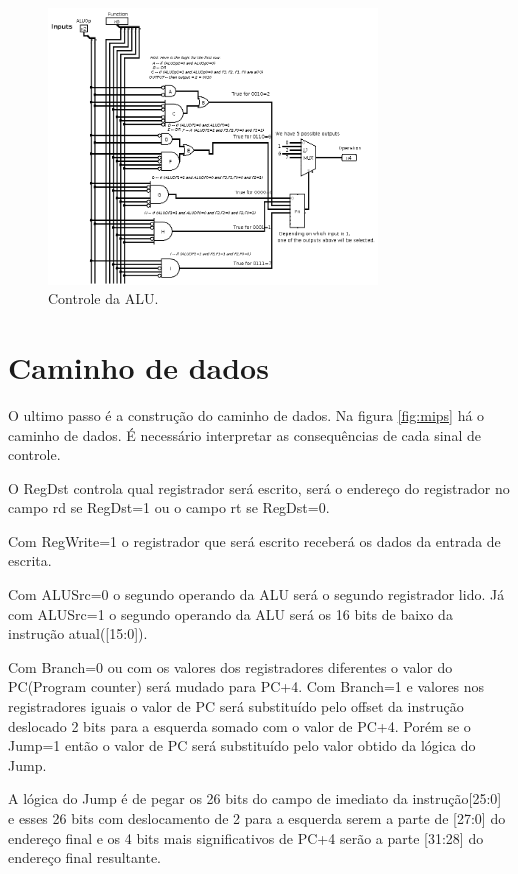 \documentclass[12pt]{article}
\begin{document}
\begin{figure}[htbp]
\centering
\includegraphics[width=330px]{./controlalu.png}
\caption{\label{fig:controlalu}
Controle da ALU.}
\end{figure}

\section{Caminho de dados}
\label{sec:org2a9f833}
O ultimo passo é a construção do caminho de dados. Na figura \ref{fig:mips} há o caminho de dados. É necessário interpretar as consequências de cada sinal de controle.

O RegDst controla qual registrador será escrito, será o endereço do registrador no campo rd se RegDst=1 ou o campo rt se RegDst=0.

Com RegWrite=1 o registrador que será escrito receberá os dados da entrada de escrita.

Com ALUSrc=0 o segundo operando da ALU será o segundo registrador lido. Já com ALUSrc=1 o segundo operando da ALU será os 16 bits de baixo da instrução atual([15:0]).

Com Branch=0 ou com os valores dos registradores diferentes o valor do PC(Program counter) será mudado para PC+4. Com Branch=1 e valores nos registradores iguais o valor de PC será substituído pelo offset da instrução deslocado 2 bits para a esquerda somado com o valor de PC+4. Porém se o Jump=1 então o valor de PC será substituído pelo valor obtido da lógica do Jump.

A lógica do Jump é de pegar os 26 bits do campo de imediato da instrução[25:0] e esses 26 bits com deslocamento de 2 para a esquerda serem a parte de [27:0] do endereço final e os 4 bits mais significativos de PC+4 serão a parte [31:28] do endereço final resultante.
\end{document}

